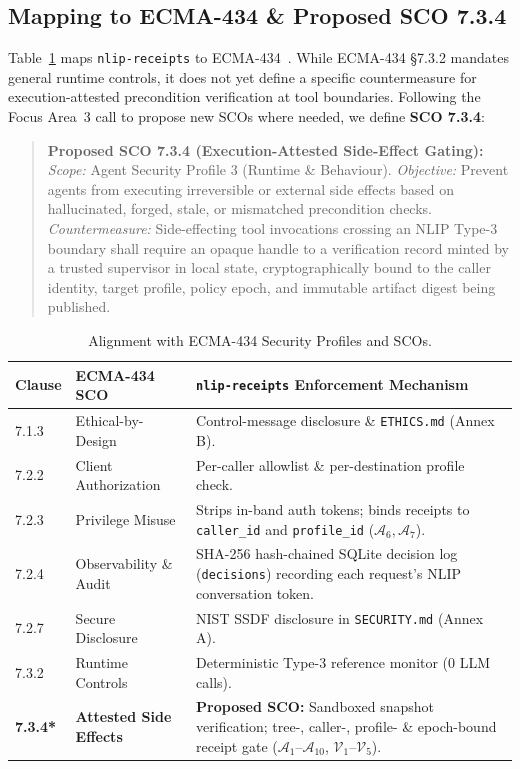 \documentclass[sigconf,nonacm]{acmart}
\begin{document}
\subsection{Mapping to ECMA-434 \& Proposed SCO 7.3.4}
Table~\ref{tab:scos} maps \texttt{nlip-receipts} to ECMA-434~\cite{ecma434}. While ECMA-434 \S7.3.2 mandates general runtime controls, it does not yet define a specific countermeasure for execution-attested precondition verification at tool boundaries. Following the Focus Area~3 call to propose new SCOs where needed, we define \textbf{SCO 7.3.4}:
\begin{quote}
\textbf{Proposed SCO 7.3.4 (Execution-Attested Side-Effect Gating):} \emph{Scope:} Agent Security Profile 3 (Runtime \& Behaviour). \emph{Objective:} Prevent agents from executing irreversible or external side effects based on hallucinated, forged, stale, or mismatched precondition checks. \emph{Countermeasure:} Side-effecting tool invocations crossing an NLIP Type-3 boundary shall require an opaque handle to a verification record minted by a trusted supervisor in local state, cryptographically bound to the caller identity, target profile, policy epoch, and immutable artifact digest being published.
\end{quote}

\begin{table}[t]
\centering
\caption{Alignment with ECMA-434 Security Profiles and SCOs.}
\label{tab:scos}
\footnotesize
\begin{tabular}{@{}llp{4.3cm}@{}}
\toprule
\textbf{Clause} & \textbf{ECMA-434 SCO} & \textbf{\texttt{nlip-receipts} Enforcement Mechanism} \\
\midrule
7.1.3 & Ethical-by-Design & Control-message disclosure \& \texttt{ETHICS.md} (Annex B). \\
7.2.2 & Client Authorization & Per-caller allowlist \& per-destination profile check. \\
7.2.3 & Privilege Misuse & Strips in-band auth tokens; binds receipts to \texttt{caller\_id} and \texttt{profile\_id} ($\mathcal{A}_6, \mathcal{A}_7$). \\
7.2.4 & Observability \& Audit & SHA-256 hash-chained SQLite decision log (\texttt{decisions}) recording each request's NLIP conversation token. \\
7.2.7 & Secure Disclosure & NIST SSDF disclosure in \texttt{SECURITY.md} (Annex A). \\
7.3.2 & Runtime Controls & Deterministic Type-3 reference monitor ($0$ LLM calls). \\
\textbf{7.3.4*} & \textbf{Attested Side Effects} & \textbf{Proposed SCO:} Sandboxed snapshot verification; tree-, caller-, profile- \& epoch-bound receipt gate ($\mathcal{A}_1$--$\mathcal{A}_{10}$, $\mathcal{V}_1$--$\mathcal{V}_5$). \\
\bottomrule
\end{tabular}
\end{table}
\end{document}
